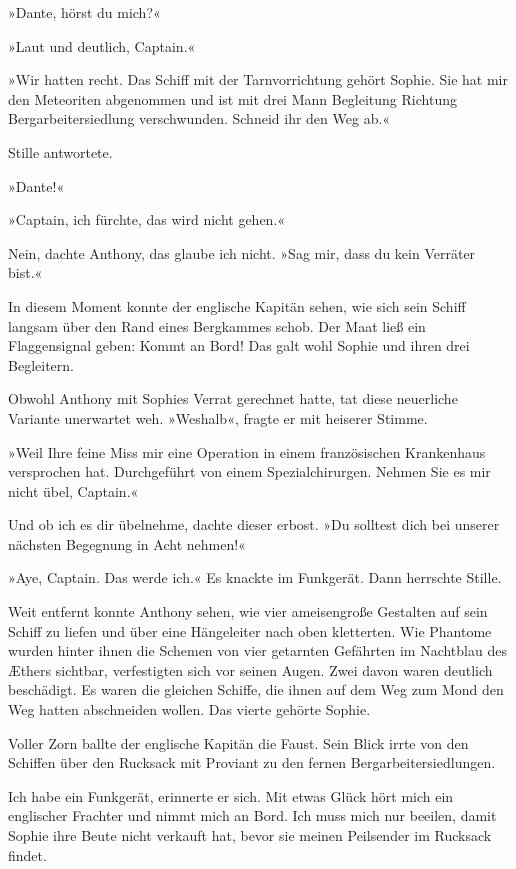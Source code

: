 »Dante, hörst du mich?«

»Laut und deutlich, Captain.«

»Wir hatten recht. Das Schiff mit der Tarnvorrichtung gehört
Sophie. Sie hat mir den Meteoriten abgenommen und ist mit drei Mann
Begleitung Richtung Bergarbeitersiedlung verschwunden. Schneid ihr
den Weg ab.«

Stille antwortete.

»Dante!«

»Captain, ich fürchte, das wird nicht gehen.«

Nein, dachte Anthony, das glaube ich nicht. »Sag mir, dass du kein
Verräter bist.«

In diesem Moment konnte der englische Kapitän sehen, wie sich sein
Schiff langsam über den Rand eines Bergkammes schob. Der Maat ließ
ein Flaggensignal geben: Kommt an Bord! Das galt wohl Sophie und
ihren drei Begleitern.

Obwohl Anthony mit Sophies Verrat gerechnet hatte, tat diese
neuerliche Variante unerwartet weh. »Weshalb«, fragte er mit
heiserer Stimme.

»Weil Ihre feine Miss mir eine Operation in einem französischen
Krankenhaus versprochen hat. Durchgeführt von einem
Spezialchirurgen. Nehmen Sie es mir nicht übel, Captain.«

Und ob ich es dir übelnehme, dachte dieser erbost. »Du solltest
dich bei unserer nächsten Begegnung in Acht nehmen!«

»Aye, Captain. Das werde ich.« Es knackte im Funkgerät. Dann
herrschte Stille.

Weit entfernt konnte Anthony sehen, wie vier ameisengroße Gestalten
auf sein Schiff zu liefen und über eine Hängeleiter nach oben
kletterten. Wie Phantome wurden hinter ihnen die Schemen von vier
getarnten Gefährten im Nachtblau des Æthers sichtbar, verfestigten
sich vor seinen Augen. Zwei davon waren deutlich beschädigt. Es
waren die gleichen Schiffe, die ihnen auf dem Weg zum Mond den Weg
hatten abschneiden wollen. Das vierte gehörte Sophie.

Voller Zorn ballte der englische Kapitän die Faust. Sein Blick
irrte von den Schiffen über den Rucksack mit Proviant zu den fernen
Bergarbeitersiedlungen.

Ich habe ein Funkgerät, erinnerte er sich. Mit etwas Glück hört
mich ein englischer Frachter und nimmt mich an Bord. Ich muss mich
nur beeilen, damit Sophie ihre Beute nicht verkauft hat, bevor sie
meinen Peilsender im Rucksack findet.

